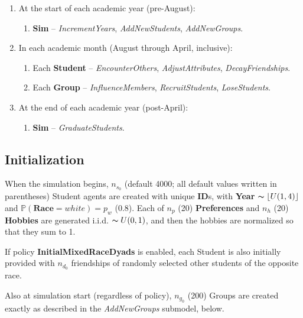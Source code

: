\begin{enumerate}
\itemsep.1em
\item At the start of each academic year (pre-August):

    \begin{enumerate}
    \itemsep.1em
    \item \textbf{Sim} -- \textsl{IncrementYears}, \textsl{AddNewStudents},
\textsl{AddNewGroups}.
    \end{enumerate}

\item In each academic month (August through April, inclusive):

    \begin{enumerate}
    \itemsep.1em
    \item Each \textbf{Student} -- \textsl{EncounterOthers},
\textsl{AdjustAttributes}, \textsl{DecayFriendships}. 
    \item Each \textbf{Group} -- \textsl{InfluenceMembers},
\textsl{RecruitStudents}, \textsl{LoseStudents}.
    \end{enumerate}

\item At the end of each academic year (post-April):

    \begin{enumerate}
    \itemsep.1em
    \item \textbf{Sim} -- \textsl{GraduateStudents}. %
    \end{enumerate}
\end{enumerate}

\subsection{Initialization}

When the simulation begins, $n_{s_0}$ (default 4000; all default values
written in parentheses) Student agents are created with unique \textbf{ID}s,
with \textbf{Year} $\thicksim \left \lfloor U(1,4) \right \rfloor$ and
$\mathbb{P}(\textbf{Race}=white) = p_w$ (0.8). Each of $n_p$ (20)
\textbf{Preferences} and $n_h$ (20) \textbf{Hobbies} are generated i.i.d.
$\thicksim U(0,1)$, and then the hobbies are normalized so that they sum to 1.

If policy \textbf{InitialMixedRaceDyads} is enabled, each Student is also
initially provided with $n_{d_0}$ friendships of randomly selected other
students of the opposite race.

Also at simulation start (regardless of policy), $n_{g_0}$ (200) Groups are
created exactly as described in the \textsl{AddNewGroups} submodel, below.

